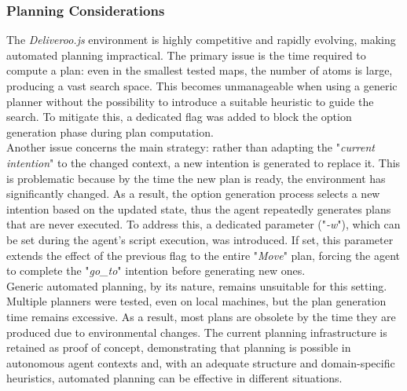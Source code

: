         \subsubsection{Planning Considerations}
            The \textit{Deliveroo.js} environment is highly competitive and rapidly evolving, making automated planning impractical. The primary issue is the time required to compute a plan: even in the smallest tested maps, the number of atoms is large, producing a vast search space. This becomes unmanageable when using a generic planner without the possibility to introduce a suitable heuristic to guide the search. To mitigate this, a dedicated flag was added to block the option generation phase during plan computation.
            \medskip\\
            Another issue concerns the main strategy: rather than adapting the "\textit{current intention}" to the changed context, a new intention is generated to replace it. This is problematic because by the time the new plan is ready, the environment has significantly changed. As a result, the option generation process selects a new intention based on the updated state, thus the agent repeatedly generates plans that are never executed. To address this, a dedicated parameter ("\textit{-w}"), which can be set during the agent's script execution, was introduced. If set, this parameter extends the effect of the previous flag to the entire "\textit{Move}" plan, forcing the agent to complete the "\textit{go\_to}" intention before generating new ones.
            \medskip\\
            Generic automated planning, by its nature, remains unsuitable for this setting. Multiple planners were tested, even on local machines, but the plan generation time remains excessive. As a result, most plans are obsolete by the time they are produced due to environmental changes. The current planning infrastructure is retained as proof of concept, demonstrating that planning is possible in autonomous agent contexts and, with an adequate structure and domain-specific heuristics, automated planning can be effective in different situations.

